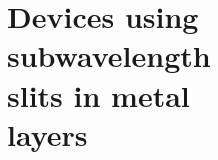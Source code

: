 \part[Devices using subwavelength slits in metal layers]{Devices using \\subwavelength \\slits in metal \\layers}